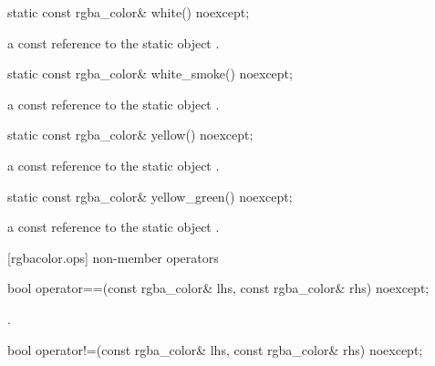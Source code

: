 \begin{itemdecl}
    static const rgba_color& white() noexcept;
\end{itemdecl}
\begin{itemdescr}
    \pnum
    \returns
    a const reference to the static  object .
\end{itemdescr}

\begin{itemdecl}
    static const rgba_color& white_smoke() noexcept;
\end{itemdecl}
\begin{itemdescr}
    \pnum
    \returns
    a const reference to the static  object .
\end{itemdescr}

\begin{itemdecl}
    static const rgba_color& yellow() noexcept;
\end{itemdecl}
\begin{itemdescr}
    \pnum
    \returns
    a const reference to the static  object .
\end{itemdescr}

\begin{itemdecl}
    static const rgba_color& yellow_green() noexcept;
\end{itemdecl}
\begin{itemdescr}
    \pnum
    \returns
    a const reference to the static  object .
\end{itemdescr}

 [rgbacolor.ops] { non-member operators}

\begin{itemdecl}
bool operator==(const rgba_color& lhs, const rgba_color& rhs) noexcept;
\end{itemdecl}
\begin{itemdescr}
	\pnum
	\returns
	.
\end{itemdescr}

\begin{itemdecl}
bool operator!=(const rgba_color& lhs, const rgba_color& rhs) noexcept;
\end{itemdecl}
\begin{itemdescr}
	\pnum
	\returns
\end{itemdescr}
